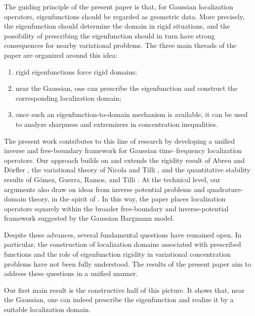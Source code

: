 \documentclass[a4paper,11pt,reqno]{amsart}
\numberwithin{equation}{section}
\theoremstyle{plain} %
\theoremstyle{definition} %
\theoremstyle{remark}
\begin{document}
The guiding principle of the present paper is that, for Gaussian localization operators, eigenfunctions should be regarded as geometric data. More precisely, the eigenfunction should determine the domain in rigid situations, and the possibility of prescribing the eigenfunction should in turn have strong consequences for nearby variational problems. The three main threads of the paper are organized around this idea:
\begin{enumerate}
\item rigid eigenfunctions force rigid domains;
\item near the Gaussian, one can prescribe the eigenfunction and construct the corresponding localization domain;
\item once such an eigenfunction-to-domain mechanism is available, it can be used to analyze sharpness and extremizers in concentration inequalities.
\end{enumerate}

\medskip

The present work contributes to this line of research by developing a unified inverse and free-boundary framework for Gaussian time--frequency localization operators. Our approach builds on and extends the rigidity result of Abreu and D\"orfler \cite{Abreu-Doerfler}, the variational theory of Nicola and Tilli \cite{Nicola-Tilli,Nicola-Tilli-2}, and the quantitative stability results of G\'omez, Guerra, Ramos, and Tilli \cite{Gomez-Guerra-Ramos-Tilli}. At the technical level, our arguments also draw on ideas from inverse potential problems and quadrature-domain theory, in the spirit of \cite{Isakov,Cherednichenko,Gustafsson,Gustafsson-Shahgholian,Shahgholian}. In this way, the paper places localization operators squarely within the broader free-boundary and inverse-potential framework suggested by the Gaussian Bargmann model.

Despite these advances, several fundamental questions have remained open. In particular, the construction of localization domains associated with prescribed functions and the role of eigenfunction rigidity in variational concentration problems have not been fully understood. The results of the present paper aim to address these questions in a unified manner.

\medskip

Our first main result is the constructive half of this picture. It shows that, near the Gaussian, one can indeed prescribe the eigenfunction and realize it by a suitable localization domain.
\end{document}

